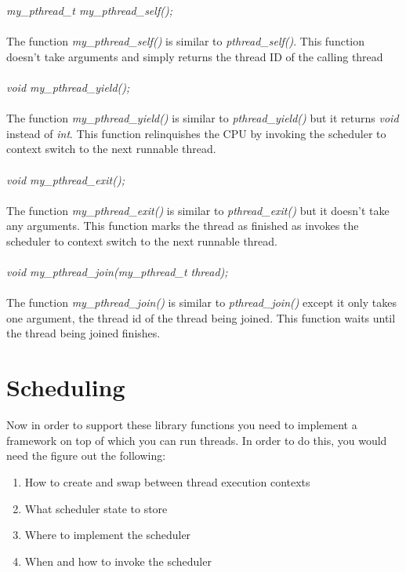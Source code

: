 \documentclass{article}
\begin{document}
\noindent \textit{my\_pthread\_t my\_pthread\_self();}\\\\
\noindent The function \textit{my\_pthread\_self()} is similar to \textit{pthread\_self()}. This function doesn’t take arguments and simply returns the thread ID of the calling thread\\\\

\noindent \textit{void my\_pthread\_yield();}\\\\
\noindent The function \textit{my\_pthread\_yield()} is similar to \textit{pthread\_yield()} but it returns \textit{void} instead of \textit{int}. This function relinquishes the CPU by invoking the scheduler to context switch to the next runnable thread.\\\\

\noindent \textit{void my\_pthread\_exit();}\\\\
\noindent The function \textit{my\_pthread\_exit()} is similar to \textit{pthread\_exit()} but it doesn’t take any arguments. This function marks the thread as finished as invokes the scheduler to context switch to the next runnable thread.\\\\

\noindent \textit{void my\_pthread\_join(my\_pthread\_t thread);}\\\\
\noindent The function \textit{my\_pthread\_join()} is similar to \textit{pthread\_join()} except it only takes one argument, the thread id of the thread being joined. This function waits until the thread being joined finishes.


\section{Scheduling}
Now in order to support these library functions you need to implement a framework on top of which you can run threads. In order to do this, you would need the figure out the following:

\begin{enumerate}
\item How to create and swap between thread execution contexts
\item What scheduler state to store
\item Where to implement the scheduler
\item When and how to invoke the scheduler
\end{enumerate}
\end{document}
